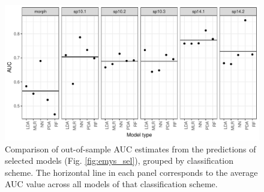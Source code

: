 \documentclass[11pt]{article}
\begin{document}
\begin{figure}[h!]
  \centering
  \includegraphics[height = 0.6\textheight, width = \textwidth, keepaspectratio = true]{figure/emys_oos_sel}
  \caption{Comparison of out-of-sample AUC estimates from the predictions of selected models (Fig. \ref{fig:emys_sel}), grouped by classification scheme. The horizontal line in each panel corresponds to the average AUC value across all models of that classification scheme.}
  \label{fig:emys_oos}
\end{figure}






%
%
%
%
\end{document}
